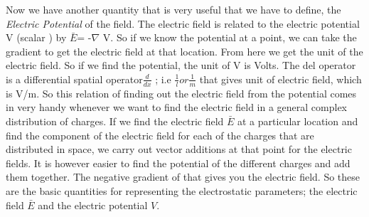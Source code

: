 \begin{mdframed}[ backgroundcolor=lightblue, linewidth=1pt, hidealllines=true]
Now we have another quantity that is very useful that we have to define, the \emph{Electric Potential} of the field. The electric field is related to the electric  potential V (scalar ) by 
$\bar{E}$= -$\nabla $ V.
So if we know the potential at a point, we can take the gradient to get the electric field at that location. From here we get the unit of the electric field. So if we find the potential, the unit of V is Volts. The del operator is a differential spatial operator$\frac{d}{dx}$ ; i.e $\frac{1}{l} or\frac{1}{m}$ that gives unit of electric field, which is V/m. So this relation of finding out the electric field from the potential comes in very handy whenever we want to find the electric field in a general complex distribution of charges. If we find the electric field  $\bar{E}$ at a particular location and find the component of the electric field for each of the charges that are distributed in space, we carry out vector additions at that point for the electric fields. It is however easier to find the potential of the different charges and add them together. The negative gradient of that gives you the electric field. So these are the basic quantities for representing the electrostatic parameters; the electric field  $\bar{E}$ and the electric potential $V$.
\end{mdframed}


